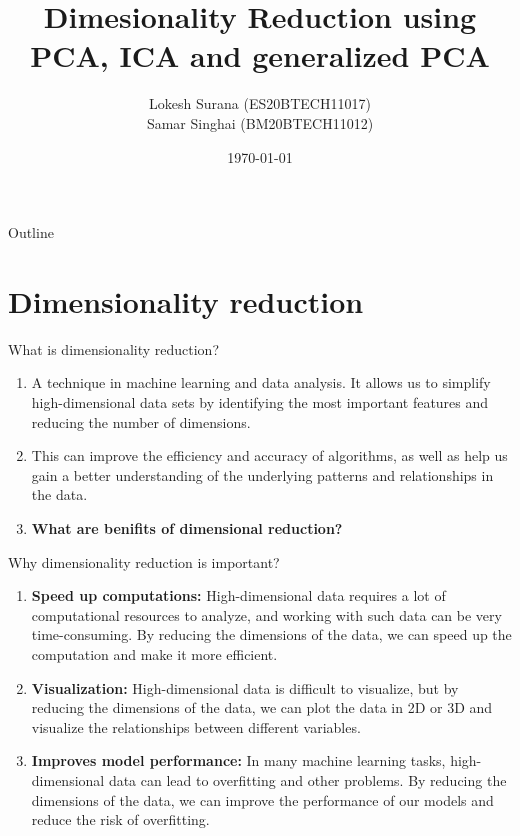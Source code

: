 \documentclass{beamer}
\title{Dimesionality Reduction using PCA, ICA and generalized PCA}
\author{Lokesh Surana (ES20BTECH11017)\\ Samar Singhai (BM20BTECH11012)}
\date{\today}
\begin{document}
\begin{frame}
    \titlepage
\end{frame}

\begin{frame}[allowframebreaks]{Outline}
    \tableofcontents
\end{frame}

\section{Dimensionality reduction}
\begin{frame}{What is dimensionality reduction?}
    \begin{enumerate}
        \item A technique in machine learning and data analysis. It allows us to simplify high-dimensional data sets by identifying the most important features and reducing the number of dimensions.
        \item This can improve the efficiency and accuracy of algorithms, as well as help us gain a better understanding of the underlying patterns and relationships in the data.
        \item \textbf{What are benifits of dimensional reduction?}
    \end{enumerate}
\end{frame}

\begin{frame}{Why dimensionality reduction is important?}
    \begin{enumerate}
        \item \textbf{Speed up computations:} High-dimensional data requires a lot of computational resources to analyze, and working with such data can be very time-consuming. By reducing the dimensions of the data, we can speed up the computation and make it more efficient.
        \item \textbf{Visualization:} High-dimensional data is difficult to visualize, but by reducing the dimensions of the data, we can plot the data in 2D or 3D and visualize the relationships between different variables.
        \item \textbf{Improves model performance:} In many machine learning tasks, high-dimensional data can lead to overfitting and other problems. By reducing the dimensions of the data, we can improve the performance of our models and reduce the risk of overfitting.
    \end{enumerate}
\end{frame}
\end{document}
